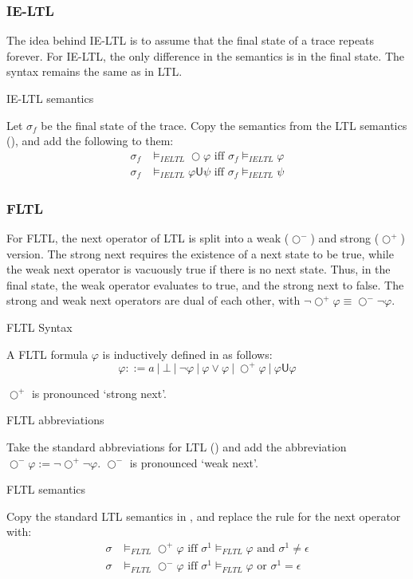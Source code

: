 \documentclass[a4paper]{article}
\newcommand{\U}{\mathsf{U}}
\newcommand{\tand}{\text{ and }}
\newcommand{\tor}{\text{ or }}
\newcommand{\tiff}{\text{ iff }}
\newcommand{\sn}{\bigcirc^+}
\newcommand{\wn}{\bigcirc^-}
\begin{document}
\subsubsection{IE-LTL} The idea behind IE-LTL is to assume that the final state of a trace repeats forever. For IE-LTL, the only difference in the semantics is in the final state. The syntax remains the same as in LTL.
\begin{defn}{IE-LTL semantics}

  Let $\sigma_f$ be the final state of the trace. Copy the semantics from the LTL semantics (), and add the following to them:
  \begin{align*}
    \sigma_f &\vDash_{IELTL} \bigcirc \varphi \tiff \sigma_f \vDash_{IELTL} \varphi\\
    \sigma_f &\vDash_{IELTL} \varphi \U \psi \tiff \sigma_f \vDash_{IELTL} \psi
  \end{align*}
\end{defn}


\subsubsection{FLTL} For FLTL, the next operator of LTL is split into a weak ($\wn$) and strong ($\sn$) version.
The strong next requires the existence of a next state to be true, while the weak next operator is vacuously true if there is no next state.
Thus, in the final state, the weak operator evaluates to true, and the strong next to false. The strong and weak next operators are dual of each other, with  $\neg\sn\varphi \equiv \wn\neg\varphi$.

\begin{defn}{FLTL Syntax}

  A FLTL formula $\varphi$ is inductively defined in as follows:
  \[\varphi ::= a ~|~ \bot ~|~ \neg \varphi ~|~\varphi \lor \varphi ~|~ \sn \varphi ~|~ \varphi \U\varphi\]

  $\sn$ is pronounced `strong next'.
\end{defn}

\begin{notn}{FLTL abbreviations}\label{fltlabbrev}

  Take the standard abbreviations for LTL () and add the abbreviation $\wn \varphi:= \neg \sn \neg \varphi$. $\wn$ is pronounced `weak next'.
\end{notn}

\begin{defn}{FLTL semantics}

  Copy the standard LTL semantics in , and replace the rule for the next operator with:
  \begin{align*}
    \sigma&\vDash_{FLTL}\sn\varphi \tiff \sigma^1\vDash_{FLTL}\varphi \tand \sigma^1 \neq \epsilon\\
    \sigma&\vDash_{FLTL}\wn\varphi \tiff \sigma^1\vDash_{FLTL}\varphi \tor \sigma^1 = \epsilon
  \end{align*}
\end{defn}
\end{document}
